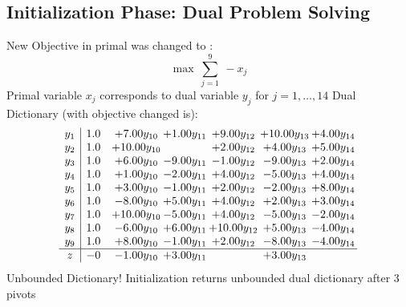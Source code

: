 \documentclass[9pt]{article}
\begin{document}
\subsection{Initialization Phase: Dual Problem Solving}
New Objective in primal was changed to : \[ \max\ \sum_{j=1}^{9}\ - x_j \] 
Primal variable $x_j$ corresponds to dual variable $y_j$ for $j = 1,\ldots,14$
Dual Dictionary (with objective changed is): 
\[\begin{array}{c| c c@{\hskip 2pt} c@{\hskip 2pt} c@{\hskip 2pt} c@{\hskip 2pt} c@{\hskip 2pt} }
 y_{1}   &  1.0 & +  7.00 y_{10} & +  1.00 y_{11} & +  9.00 y_{12} & + 10.00 y_{13} & +  4.00 y_{14}\\
 y_{2}   &  1.0 & + 10.00 y_{10} &   & +  2.00 y_{12} & +  4.00 y_{13} & +  5.00 y_{14}\\
 y_{3}   &  1.0 & +  6.00 y_{10} & -9.00 y_{11} & -1.00 y_{12} & -9.00 y_{13} & +  2.00 y_{14}\\
 y_{4}   &  1.0 & +  1.00 y_{10} & -2.00 y_{11} & +  4.00 y_{12} & -5.00 y_{13} & +  4.00 y_{14}\\
 y_{5}   &  1.0 & +  3.00 y_{10} & -1.00 y_{11} & +  2.00 y_{12} & -2.00 y_{13} & +  8.00 y_{14}\\
 y_{6}   &  1.0 & -8.00 y_{10} & +  5.00 y_{11} & +  4.00 y_{12} & +  2.00 y_{13} & +  3.00 y_{14}\\
 y_{7}   &  1.0 & + 10.00 y_{10} & -5.00 y_{11} & +  4.00 y_{12} & -5.00 y_{13} & -2.00 y_{14}\\
 y_{8}   &  1.0 & -6.00 y_{10} & +  6.00 y_{11} & + 10.00 y_{12} & +  5.00 y_{13} & -4.00 y_{14}\\
 y_{9}   &  1.0 & +  8.00 y_{10} & -1.00 y_{11} & +  2.00 y_{12} & -8.00 y_{13} & -4.00 y_{14}\\
\hline
z    &  -0 & -1.00 y_{10} & +  3.00 y_{11} &   & +  3.00 y_{13} &   \\
\end{array}\]
Unbounded Dictionary!
Initialization returns unbounded dual dictionary after 3 pivots
\end{document}
